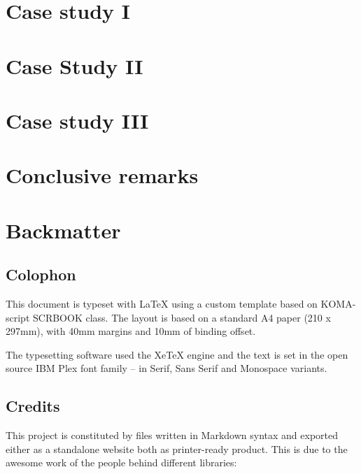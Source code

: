 \documentclass[
  a4paper,
  twoside,
  12pt,
  chapterprefix=false,
  bibliography=totocnumbered,
  listof=flat]{scrbook}
\begin{document}
\hypertarget{case-study-i}{%
\chapter{Case study I}\label{case-study-i}}

\hypertarget{case-study-ii}{%
\chapter{Case Study II}\label{case-study-ii}}

\hypertarget{case-study-iii}{%
\chapter{Case study III}\label{case-study-iii}}

\hypertarget{conclusive-remarks}{%
\chapter{Conclusive remarks}\label{conclusive-remarks}}

\backmatter

\hypertarget{backmatter}{%
\chapter{Backmatter}\label{backmatter}}

\hypertarget{colophon}{%
\section{Colophon}\label{colophon}}

This document is typeset with LaTeX using a custom template based on KOMA-script SCRBOOK class. The layout is based on a standard A4 paper (210 x 297mm), with 40mm margins and 10mm of binding offset.

The typesetting software used the XeTeX engine and the text is set in the open source IBM Plex font family -- in Serif, Sans Serif and Monospace variants.

\hypertarget{credits}{%
\section{Credits}\label{credits}}

This project is constituted by files written in Markdown syntax and exported either as a standalone website both as printer-ready product. This is due to the awesome work of the people behind different libraries:
\end{document}
